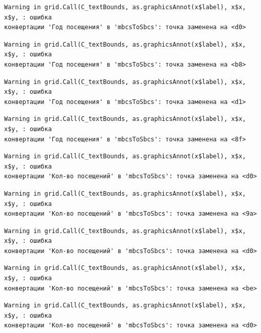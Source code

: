 \documentclass[
  letterpaper,
  DIV=11,
  numbers=noendperiod]{scrreprt}
\begin{document}
\begin{verbatim}
Warning in grid.Call(C_textBounds, as.graphicsAnnot(x$label), x$x, x$y, : ошибка
конвертации 'Год посещения' в 'mbcsToSbcs': точка заменена на <d0>
\end{verbatim}

\begin{verbatim}
Warning in grid.Call(C_textBounds, as.graphicsAnnot(x$label), x$x, x$y, : ошибка
конвертации 'Год посещения' в 'mbcsToSbcs': точка заменена на <b8>
\end{verbatim}

\begin{verbatim}
Warning in grid.Call(C_textBounds, as.graphicsAnnot(x$label), x$x, x$y, : ошибка
конвертации 'Год посещения' в 'mbcsToSbcs': точка заменена на <d1>
\end{verbatim}

\begin{verbatim}
Warning in grid.Call(C_textBounds, as.graphicsAnnot(x$label), x$x, x$y, : ошибка
конвертации 'Год посещения' в 'mbcsToSbcs': точка заменена на <8f>
\end{verbatim}

\begin{verbatim}
Warning in grid.Call(C_textBounds, as.graphicsAnnot(x$label), x$x, x$y, : ошибка
конвертации 'Кол-во посещений' в 'mbcsToSbcs': точка заменена на <d0>
\end{verbatim}

\begin{verbatim}
Warning in grid.Call(C_textBounds, as.graphicsAnnot(x$label), x$x, x$y, : ошибка
конвертации 'Кол-во посещений' в 'mbcsToSbcs': точка заменена на <9a>
\end{verbatim}

\begin{verbatim}
Warning in grid.Call(C_textBounds, as.graphicsAnnot(x$label), x$x, x$y, : ошибка
конвертации 'Кол-во посещений' в 'mbcsToSbcs': точка заменена на <d0>
\end{verbatim}

\begin{verbatim}
Warning in grid.Call(C_textBounds, as.graphicsAnnot(x$label), x$x, x$y, : ошибка
конвертации 'Кол-во посещений' в 'mbcsToSbcs': точка заменена на <be>
\end{verbatim}

\begin{verbatim}
Warning in grid.Call(C_textBounds, as.graphicsAnnot(x$label), x$x, x$y, : ошибка
конвертации 'Кол-во посещений' в 'mbcsToSbcs': точка заменена на <d0>
\end{verbatim}
\end{document}
